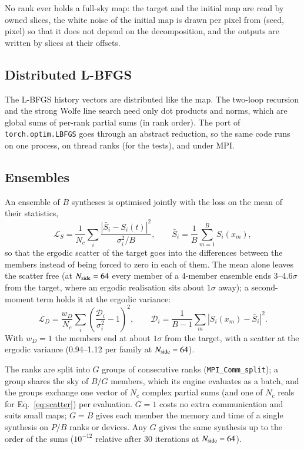 \documentclass{aa}
\newcommand{\nside}{N_{\rm side}}
\begin{document}
No rank ever holds a full-sky map: the target and the initial map are read by owned slices, the white noise of the initial map is drawn per pixel from (seed, pixel) so that it does not depend on the decomposition, and the outputs are written by slices at their offsets.

\subsection{Distributed L-BFGS}

The L-BFGS history vectors are distributed like the map. The two-loop recursion and the strong Wolfe line search need only dot products and norms, which are global sums of per-rank partial sums (in rank order). The port of \texttt{torch.optim.LBFGS} goes through an abstract reduction, so the same code runs on one process, on thread ranks (for the tests), and under MPI.

\subsection{Ensembles}
\label{sec:ensembles}

An ensemble of $B$ syntheses is optimised jointly with the loss on the mean of their statistics,
\begin{equation}
\mathcal{L}_S = \frac{1}{N_c}\sum_i \frac{|\bar S_i - S_i(t)|^2}{\sigma_i^2/B}, \qquad \bar S_i = \frac{1}{B}\sum_{m=1}^{B} S_i(x_m),
\label{eq:ensemble}
\end{equation}
so that the ergodic scatter of the target goes into the differences between the members instead of being forced to zero in each of them. The mean alone leaves the scatter free (at $\nside=64$ every member of a 4-member ensemble ends 3--4.6$\sigma$ from the target, where an ergodic realisation sits about $1\sigma$ away); a second-moment term holds it at the ergodic variance:
\begin{equation}
\mathcal{L}_D = \frac{w_D}{N_c}\sum_i\left(\frac{\mathcal{D}_i}{\sigma_i^2}-1\right)^2, \qquad \mathcal{D}_i = \frac{1}{B-1}\sum_m |S_i(x_m) - \bar S_i|^2.
\label{eq:scatter}
\end{equation}
With $w_D=1$ the members end at about $1\sigma$ from the target, with a scatter at the ergodic variance (0.94--1.12 per family at $\nside=64$).

The ranks are split into $G$ groups of consecutive ranks (\texttt{MPI\_Comm\_split}); a group shares the sky of $B/G$ members, which its engine evaluates as a batch, and the groups exchange one vector of $N_c$ complex partial sums (and one of $N_c$ reals for Eq.~\ref{eq:scatter}) per evaluation. $G=1$ costs no extra communication and suits small maps; $G=B$ gives each member the memory and time of a single synthesis on $P/B$ ranks or devices. Any $G$ gives the same synthesis up to the order of the sums ($10^{-12}$ relative after 30 iterations at $\nside=64$).
\end{document}
